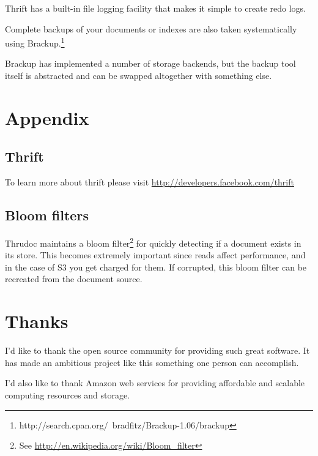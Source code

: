 \documentclass[nocopyrightspace,blockstyle]{sigplanconf}
\begin{document}
Thrift has a built-in file logging facility that makes it simple to create redo logs.

Complete backups of your documents or indexes are also taken systematically using Brackup.\footnote{http://search.cpan.org/~bradfitz/Brackup-1.06/brackup}

Brackup has implemented a number of storage backends, but the backup tool itself is abstracted and can be swapped altogether with something else.

\section{Appendix}

\subsection{Thrift}

To learn more about thrift please visit \url{http://developers.facebook.com/thrift}

\subsection{Bloom filters}

Thrudoc maintains a bloom filter\footnote{See \url{http://en.wikipedia.org/wiki/Bloom_filter}}
for quickly detecting if a document exists in its store.
This becomes extremely important since reads affect performance, and in the case of S3 you get charged for them.
If corrupted, this bloom filter can be recreated from the document source.

\section{Thanks}

I'd like to thank the open source community for providing such great software.
It has made an ambitious project like this something one person can accomplish.

I'd also like to thank Amazon web services for providing affordable and scalable
computing resources and storage.
\end{document}
